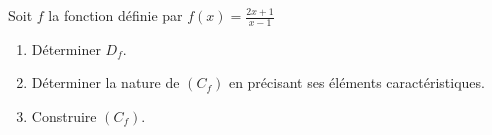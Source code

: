 \begin{Application}
Soit $f$ la fonction définie par $f(x) = \frac{2x+1}{x-1}$
\begin{enumerate}
    \item Déterminer $D_f$.
    \item Déterminer la nature de $(C_f)$ en précisant ses éléments caractéristiques.
    \item Construire $(C_f)$.
\end{enumerate}
\end{Application}
